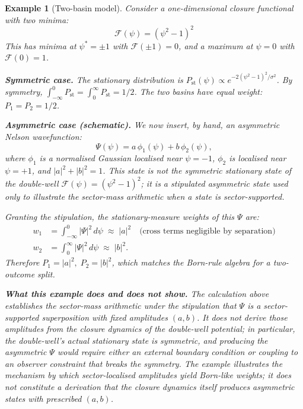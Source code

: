 \documentclass[12pt]{article}
\newtheorem{example}[theorem]{Example}
\newcommand{\Fcal}{\mathcal{F}}
\newcommand{\Pst}{P_{\mathrm{st}}}
\begin{document}
\begin{example}[Two-basin model]\label{ex:two_basin}
Consider a one-dimensional closure functional with two minima:
\begin{equation}
    \Fcal(\psi) = (\psi^2 - 1)^2
\end{equation}
This has minima at $\psi^* = \pm 1$ with $\Fcal(\pm 1) = 0$, and a maximum at $\psi = 0$ with $\Fcal(0) = 1$.

\textbf{Symmetric case.} The stationary distribution is $\Pst(\psi) \propto e^{-2(\psi^2-1)^2/\sigma^2}$. By symmetry, $\int_{-\infty}^0 \Pst = \int_0^\infty \Pst = 1/2$. The two basins have equal weight: $P_1 = P_2 = 1/2$.

\textbf{Asymmetric case (schematic).} We now insert, \emph{by hand}, an asymmetric Nelson wavefunction:
\begin{equation}
    \Psi(\psi) = a\, \phi_1(\psi) + b\, \phi_2(\psi),
\end{equation}
where $\phi_1$ is a normalised Gaussian localised near $\psi = -1$, $\phi_2$ is localised near $\psi = +1$, and $|a|^2 + |b|^2 = 1$. This state is \emph{not} the symmetric stationary state of the double-well $\Fcal(\psi) = (\psi^2-1)^2$; it is a stipulated asymmetric state used only to illustrate the sector-mass arithmetic when a state is sector-supported.

Granting the stipulation, the stationary-measure weights of this $\Psi$ are:
\begin{align}
    w_1 &= \int_{-\infty}^{0} |\Psi|^2\, d\psi \;\approx\; |a|^2 \quad \text{(cross terms negligible by separation)} \\
    w_2 &= \int_{0}^{\infty} |\Psi|^2\, d\psi \;\approx\; |b|^2.
\end{align}
Therefore $P_1 = |a|^2, \; P_2 = |b|^2$, which matches the Born-rule algebra for a two-outcome split.

\textbf{What this example does and does not show.} The calculation above establishes the sector-mass arithmetic under the stipulation that $\Psi$ is a sector-supported superposition with fixed amplitudes $(a,b)$. It \emph{does not} derive those amplitudes from the closure dynamics of the double-well potential; in particular, the double-well's actual stationary state is symmetric, and producing the asymmetric $\Psi$ would require either an external boundary condition or coupling to an observer constraint that breaks the symmetry. The example illustrates the mechanism by which sector-localised amplitudes yield Born-like weights; it does not constitute a derivation that the closure dynamics itself produces asymmetric states with prescribed $(a,b)$.
\end{example}
\end{document}
